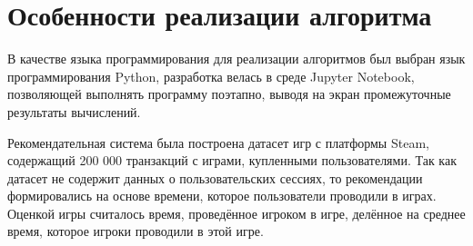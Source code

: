 \chapter{Особенности реализации алгоритма}

В качестве языка программирования для реализации алгоритмов был выбран язык программирования Python, разработка велась в среде Jupyter Notebook, позволяющей выполнять программу поэтапно, выводя на экран промежуточные результаты вычислений.

Рекомендательная система была построена датасет игр с платформы Steam, содержащий 200 000 транзакций с играми, купленными пользователями. Так как датасет не содержит данных о пользовательских сессиях, то рекомендации формировались на основе времени, которое пользователи проводили в играх. Оценкой игры считалось время, проведённое игроком в игре, делённое на среднее время, которое игроки проводили в этой игре.

\clearpage
